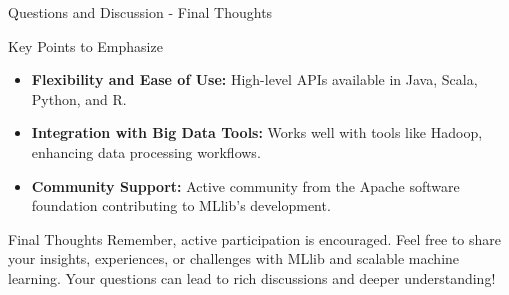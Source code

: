 \documentclass[aspectratio=169]{beamer}
\begin{document}
\begin{frame}[fragile]{Questions and Discussion - Final Thoughts}
    \begin{block}{Key Points to Emphasize}
        \begin{itemize}
            \item \textbf{Flexibility and Ease of Use:} High-level APIs available in Java, Scala, Python, and R.
            \item \textbf{Integration with Big Data Tools:} Works well with tools like Hadoop, enhancing data processing workflows.
            \item \textbf{Community Support:} Active community from the Apache software foundation contributing to MLlib's development.
        \end{itemize}
    \end{block}
    \begin{block}{Final Thoughts}
        Remember, active participation is encouraged. Feel free to share your insights, experiences, or challenges with MLlib and scalable machine learning. Your questions can lead to rich discussions and deeper understanding!
    \end{block}
\end{frame}
\end{document}
